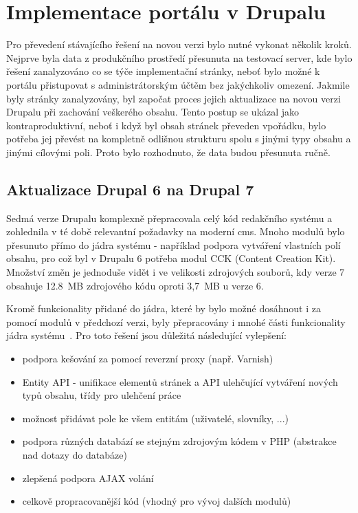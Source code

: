 \chapter{Implementace portálu v Drupalu}
\label{chap:implementace-drupal}

Pro převedení stávajícího řešení na novou verzi bylo nutné vykonat několik kroků. Nejprve byla data z produkčního prostředí přesunuta na testovací server, kde bylo řešení zanalyzováno co se týče implementační stránky, neboť bylo možné k portálu přistupovat s administrátorským účtěm bez jakýchkoliv omezení. Jakmile byly stránky zanalyzovány, byl započat proces jejich aktualizace na novou verzi Drupalu při zachování veškerého obsahu. Tento postup se ukázal jako kontraproduktivní, neboť i když byl obsah stránek převeden vpořádku, bylo potřeba jej převést na kompletně odlišnou strukturu spolu s jinými typy obsahu a jinými cílovými poli. Proto bylo rozhodnuto, že data budou přesunuta ručně.

\section{Aktualizace Drupal 6 na Drupal 7}
Sedmá verze Drupalu komplexně přepracovala celý kód redakčního systému a zohlednila v té době relevantní požadavky na moderní \gls{cms}. Mnoho modulů bylo přesunuto přímo do jádra systému - například podpora vytváření vlastních polí obsahu, pro což byl v Drupalu 6 potřeba modul CCK (Content Creation Kit). Množství změn je jednoduše vidět i ve velikosti zdrojových souborů, kdy verze 7 obsahuje 12.8~MB zdrojového kódu oproti 3,7~MB u verze 6.

Kromě funkcionality přidané do jádra, které by bylo možné dosáhnout i za pomocí modulů v předchozí verzi, byly přepracovány i mnohé části funkcionality jádra systému~\cite{website:drupal-comparison}. Pro toto řešení jsou důležitá následující vylepšení:

\begin{itemize}
  \item podpora kešování za pomocí reverzní proxy (např. Varnish)
  \item Entity API - unifikace elementů stránek a API ulehčující vytváření nových typů obsahu, třídy pro ulehčení práce~\cite{drupal-entities}
  \item možnost přidávat pole ke všem entitám (uživatelé, slovníky, ...)
  \item podpora různých databází se stejným zdrojovým kódem v PHP (abstrakce nad dotazy do databáze)
  \item zlepšená podpora AJAX volání
  \item celkově propracovanější kód (vhodný pro vývoj dalších modulů)
\end{itemize}

